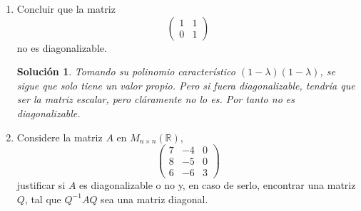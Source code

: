 \documentclass[letterpaper]{article}
\newcommand{\R}{\mathbb{R}}
\newtheorem*{sol}{Solución}
\begin{document}
\begin{enumerate}
\begin{enumerate}[label=(\alph*)]
    \begin{proof}
    Sea
    $
        D = 
        \begin{pmatrix}
            a_1    & 0      & \cdots & 0\\
            0      & a_2    & \cdots & 0\\
            \vdots & \vdots & \ddots & \vdots\\
            0      & 0      & \cdots & a_n
        \end{pmatrix}
    $
    una matriz diagonal. El polinomio característico de $D$ es
    \[
        \det(D - \lambda I_3) = (a_1 - \lambda)(a_2 - \lambda)\cdots(a_n - \lambda)
    \]
    Pero como por hipótesis solo tiene un valor propio, llamémosle $a$ se tiene que
    \[
        D = 
        \begin{pmatrix}
            a      & 0      & \cdots & 0\\
            0      & a      & \cdots & 0\\
            \vdots & \vdots & \ddots & \vdots\\
            0      & 0      & \cdots & a
        \end{pmatrix} =
        a I_3
    \]
    Por tanto $D$ es una matriz escalar.
    \end{proof}

    \item Concluir que la matriz
    \[
        \begin{pmatrix}
        1 & 1\\
        0 & 1
        \end{pmatrix}
    \]
    no es diagonalizable.

    \begin{sol}
    Tomando su polinomio característico $(1 - \lambda) (1 - \lambda)$, se sigue que solo tiene un valor propio. Pero si
    fuera diagonalizable, tendría que ser la matriz escalar, pero cláramente no lo es. Por tanto no es diagonalizable.
    \end{sol}

    \item Considere la matriz $A$ en $M_{n \times n}(\R)$,
    \[
        \begin{pmatrix}
        7 & -4 & 0\\
        8 & -5 & 0\\
        6 & -6 & 3
        \end{pmatrix}
    \]
    justificar si $A$ es diagonalizable o no y, en caso de serlo, encontrar una matriz $Q$, tal que $Q^{-1}AQ$ sea
    una matriz diagonal.


\end{enumerate}
\end{enumerate}
\end{document}

